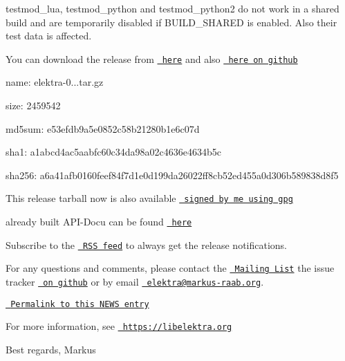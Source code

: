 \begin{DoxyItemize}
\item {\ttfamily testmod\+\_\+lua}, {\ttfamily testmod\+\_\+python} and {\ttfamily testmod\+\_\+python2} do not work in a shared build and are temporarily disabled if {\ttfamily B\+U\+I\+L\+D\+\_\+\+S\+H\+A\+R\+ED} is enabled. Also their test data is affected.
\end{DoxyItemize}

You can download the release from \href{https://www.libelektra.org/ftp/elektra/releases/elektra-0.8.17.tar.gz}{\texttt{ here}} and also \href{https://github.com/ElektraInitiative/ftp/tree/master/releases/elektra-0.8.17.tar.gz}{\texttt{ here on github}}


\begin{DoxyItemize}
\item name\+: elektra-\/0...\+tar.\+gz
\item size\+: 2459542
\item md5sum\+: e53efdb9a5e0852c58b21280b1e6c07d
\item sha1\+: a1abcd4ac5aabfc60c34da98a02c4636e4634b5c
\item sha256\+: a6a41afb0160feef84f7d1e0d199da26022ff8cb52ed455a0d306b589838d8f5
\end{DoxyItemize}

This release tarball now is also available \href{https://www.libelektra.org/ftp/elektra/releases/elektra-0.8.17.tar.gz.gpg}{\texttt{ signed by me using gpg}}

already built A\+P\+I-\/\+Docu can be found \href{https://doc.libelektra.org/api/0.8.17/html/}{\texttt{ here}}

Subscribe to the \href{https://doc.libelektra.org/news/feed.rss}{\texttt{ R\+SS feed}} to always get the release notifications.

For any questions and comments, please contact the \href{https://lists.sourceforge.net/lists/listinfo/registry-list}{\texttt{ Mailing List}} the issue tracker \href{https://git.libelektra.org/issues}{\texttt{ on github}} or by email \href{mailto:elektra@markus-raab.org}{\texttt{ elektra@markus-\/raab.\+org}}.

\href{https://doc.libelektra.org/news/e6153a39-c4bd-41c3-bc86-785d451eb6c5.html}{\texttt{ Permalink to this N\+E\+WS entry}}

For more information, see \href{https://libelektra.org}{\texttt{ https\+://libelektra.\+org}}

Best regards, Markus 